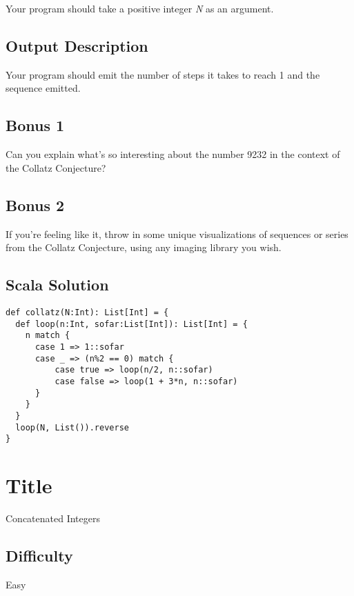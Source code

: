 Your program should take a positive integer \emph{N} as an argument.

\subsection{Output Description}\label{output-description-14}

Your program should emit the number of steps it takes to reach 1 and the
sequence emitted.

\subsection{Bonus 1}\label{bonus-1}

Can you explain what's so interesting about the number 9232 in the
context of the Collatz Conjecture?

\subsection{Bonus 2}\label{bonus-2}

If you're feeling like it, throw in some unique visualizations of
sequences or series from the Collatz Conjecture, using any imaging
library you wish.

\subsection{Scala Solution}\label{scala-solution-13}

\begin{verbatim}
def collatz(N:Int): List[Int] = {
  def loop(n:Int, sofar:List[Int]): List[Int] = {
    n match {
      case 1 => 1::sofar
      case _ => (n%2 == 0) match {
          case true => loop(n/2, n::sofar)
          case false => loop(1 + 3*n, n::sofar)
      }
    }
  }
  loop(N, List()).reverse
}
\end{verbatim}

\section{Title}\label{title-20}

Concatenated Integers

\subsection{Difficulty}\label{difficulty-19}

Easy

